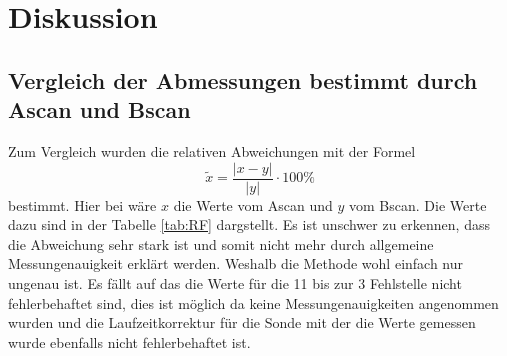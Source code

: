 \section{Diskussion}
\label{sec:Diskussion}
\subsection{Vergleich der Abmessungen bestimmt durch Ascan und Bscan}
Zum Vergleich wurden die relativen Abweichungen mit der Formel
\begin{equation*}
  \tilde{x} = \frac{\lvert x - y\rvert}{\lvert y \rvert} \cdot 100 \%
\end{equation*}
bestimmt. Hier bei wäre $x$ die Werte vom Ascan und $y$ vom Bscan. Die Werte
dazu sind in der Tabelle \ref{tab:RF} dargstellt. Es ist unschwer zu erkennen,
dass die Abweichung sehr stark ist und somit nicht mehr durch allgemeine Messungenauigkeit
erklärt werden. Weshalb die Methode wohl einfach nur ungenau ist.
Es fällt auf das die Werte für die 11 bis zur 3 Fehlstelle nicht fehlerbehaftet
sind, dies ist möglich da keine Messungenauigkeiten angenommen wurden und die
Laufzeitkorrektur für die Sonde mit der die Werte gemessen wurde ebenfalls
nicht fehlerbehaftet ist. 
